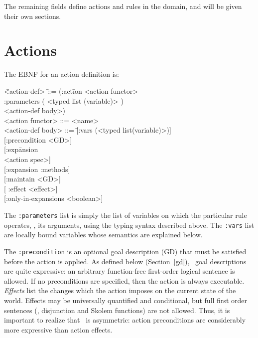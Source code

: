 The remaining fields define actions and rules in the domain, and will be given
their own sections.

    \section{Actions}
\label{actions}

The EBNF  for an action definition is:

\begin{nopagebreak}\begin{tabtt}
\bump\=  <action-def> \bump \= ::= (:act\=ion <action functor>\+\+\+\\
                        :parameters  ( <typed list (variable)> ) \\
                        <action-def body>) \-\-\\
   <action functor> \> ::= <name> \\
   <action-def body> \>::= \={[}:vars (<typed list(variable)>)]  \+\+\\
   		        {[}:precondition <GD>] \\
                       {[}:exp\=ansion  \+\\
                              <action spec>] \-\\
                       {[}:expansion :methods] \\
                       {[}:maintain <GD>] \\
                       {[} :effect       <effect>]  \\
                       {[}:only-in-expansions <boolean>]
\-\-\\
\end{tabtt}\end{nopagebreak}

The {\tt :parameters} list is simply the list of variables on which the
particular rule operates, \ie, its arguments, using the typing syntax
described above.  The {\tt :vars} list are locally bound variables whose
semantics are explained below.

The {\tt :precondition}
is an optional goal description (GD) that must be satisfied before
the action is applied. As defined below (Section~\ref{gd}), 
\lang\ goal descriptions
are quite expressive: an arbitrary function-free first-order logical
sentence is allowed.  If no preconditions are specified, then the
action is always executable. {\em Effects} list the changes which
the action imposes on the current state of the world.  Effects may
be universally quantified and conditional, but full first order
sentences (\eg, disjunction and Skolem functions) are not allowed.
Thus, it is important to realize that \lang\ is asymmetric: action
preconditions are considerably more expressive than action effects.

